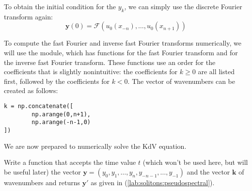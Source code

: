To obtain the initial condition for the \(y_k\), we can simply use the discrete Fourier transform again:
\[
\mathbf{y}(0) = \mathcal{F}(u_0(x_{-n}),\ldots,u_0(x_{n+1}))
\]

To compute the fast Fourier and inverse fast Fourier transforms numerically, we will use the  module, which has functions  for the fast Fourier transform and  for the inverse fast Fourier transform.
These functions use an order for the coefficients that is slightly nonintuitive: the coefficients for \(k\geq 0\) are all listed first, followed by the coefficients for \(k<0\).
The vector of wavenumbers can be created as follows:
\begin{lstlisting}
k = np.concatenate([
        np.arange(0,n+1),
        np.arange(-n-1,0)
])
\end{lstlisting}
We are now prepared to numerically solve the KdV equation.

\begin{problem}
Write a function that accepts the time value \(t\) (which won't be used here, but will be useful later) the vector \(\mathbf{y}=(y_0,y_1,\ldots,y_n,y_{-n-1},\ldots,y_{-1})\) and the vector \(\mathbf{k}\) of wavenumbers and returns \(\mathbf{y}'\) as given in (\ref{lab:solitons:pseudospectral}).
\end{problem}

